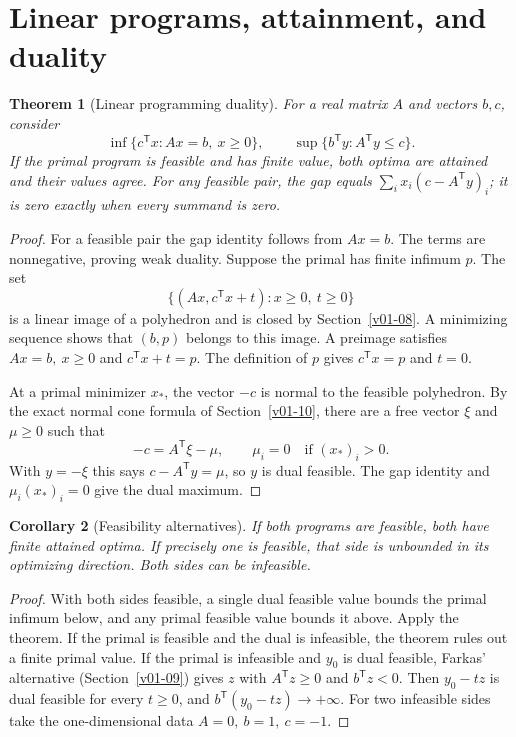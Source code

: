 \documentclass[11pt,oneside,openany]{book}
\theoremstyle{plain}
\newtheorem{theorem}{Theorem}[chapter]
\newtheorem{corollary}[theorem]{Corollary}
\theoremstyle{definition}
\theoremstyle{remark}
\begin{document}
\section{Linear programs, attainment, and duality}
\label{v05-01}

\begin{theorem}[Linear programming duality]\label{thm:linear-programming-duality}
For a real matrix \(A\) and vectors \(b,c\), consider
\[
 \inf\{c^{\mathsf T}x:Ax=b,\ x\ge0\},\qquad
 \sup\{b^{\mathsf T}y:A^{\mathsf T}y\le c\}.
\]
If the primal program is feasible and has finite value,
both optima are attained and their values agree.
For any feasible pair, the gap equals
\(\sum_i x_i(c-A^{\mathsf T}y)_i\); it is zero
exactly when every summand is zero.
\end{theorem}

\begin{proof}
For a feasible pair the gap identity follows from \(Ax=b\).
The terms are nonnegative, proving weak duality.
Suppose the primal has finite infimum \(p\).
The set
\[
 \{(Ax,c^{\mathsf T}x+t):x\ge0,\ t\ge0\}
\]
is a linear image of a polyhedron and is closed by
Section~\ref{v01-08}. A minimizing sequence shows that
\((b,p)\) belongs to this image. A preimage satisfies
\(Ax=b,\ x\ge0\) and \(c^{\mathsf T}x+t=p\).
The definition of \(p\) gives \(c^{\mathsf T}x=p\)
and \(t=0\).

At a primal minimizer \(x_*\), the vector \(-c\)
is normal to the feasible polyhedron. By the exact
normal cone formula of Section~\ref{v01-10}, there are
a free vector \(\xi\) and \(\mu\ge0\) such that
\[
 -c=A^{\mathsf T}\xi-\mu,\qquad
 \mu_i=0\quad\text{if }(x_*)_i>0.
\]
With \(y=-\xi\) this says \(c-A^{\mathsf T}y=\mu\),
so \(y\) is dual feasible. The gap identity and
\(\mu_i(x_*)_i=0\) give the dual maximum.
\end{proof}

\begin{corollary}[Feasibility alternatives]\label{cor:lp-alternatives}
If both programs are feasible, both have finite attained
optima. If precisely one is feasible, that side is unbounded
in its optimizing direction. Both sides can be infeasible.
\end{corollary}

\begin{proof}
With both sides feasible, a single dual feasible value
bounds the primal infimum below, and any primal feasible
value bounds it above. Apply the theorem.
If the primal is feasible and the dual is infeasible,
the theorem rules out a finite primal value.
If the primal is infeasible and \(y_0\) is dual feasible,
Farkas' alternative (Section~\ref{v01-09}) gives \(z\)
with \(A^{\mathsf T}z\ge0\) and \(b^{\mathsf T}z<0\).
Then \(y_0-tz\) is dual feasible for every \(t\ge0\),
and \(b^{\mathsf T}(y_0-tz)\to+\infty\).
For two infeasible sides take the one-dimensional data
\(A=0,\ b=1,\ c=-1\).
\end{proof}
\end{document}

